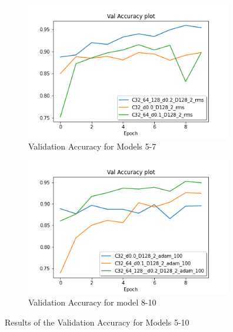\documentclass[twocolumn,letterpaper,10pt]{article}
\begin{document}
\begin{figure}[!h]
\begin{subfigure}{0.5\textwidth}
\includegraphics[width=0.9\linewidth, height=6cm]{Figure 3 - Validation Plot 1.png} 
\caption{Validation Accuracy for Models 5-7}
\label{fig:rmsval}
\end{subfigure}
\begin{subfigure}{0.5\textwidth}
\includegraphics[width=0.9\linewidth, height=6cm]{val adam.png}
\caption{Validation Accuracy for model 8-10}
\label{fig:adamval}
\end{subfigure}

\caption{Results of the Validation Accuracy for Models 5-10}
\label{fig:c}
\end{figure}



\end{document}
